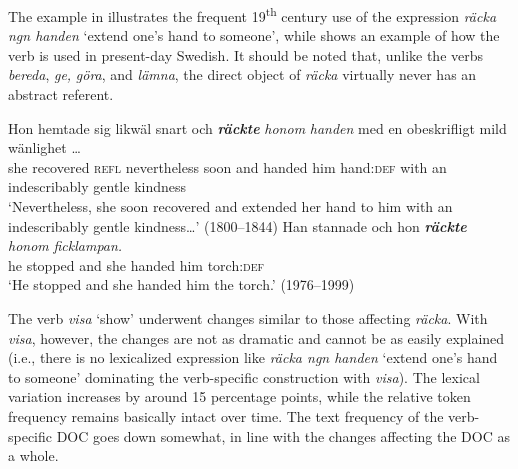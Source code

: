 \documentclass[output=paper]{langscibook}
\begin{document}
The example in  illustrates the frequent 19\textsuperscript{th} century use of the expression \textit{räcka ngn handen} ‘extend one's hand to someone’, while  shows an example of how the verb is used in present-day Swedish. It should be noted that, unlike the verbs \textit{bereda}, \textit{ge,} \textit{göra}, and \textit{lämna}, the direct object of \textit{räcka} virtually never has an abstract referent.


\ea \label{ex:valdeson:16}
\gll Hon hemtade   sig     likwäl        snart  och \textbf{\textit{räckte}} \textit{honom}  \textit{handen} med  en  obeskrifligt    mild    wänlighet …\\
  she  recovered  \textsc{refl}  nevertheless    soon  and  handed him   hand\textsc{:def} with  an  indescribably  gentle  kindness\\
\glt ‘Nevertheless, she soon recovered and extended her hand to him with an indescribably gentle kindness…’ (1800–1844)
\ex \label{ex:valdeson:17}
\gll Han  stannade och  hon \textbf{\textit{räckte}} \textit{honom}      \textit{ficklampan.}\\
  he        stopped  and   she handed him         torch:\textsc{def}\\
\glt `He stopped and she handed him the torch.’ (1976–1999)
\z


\label{sec:valdeson:5.3.2.2}
The verb \textit{visa} ‘show’ underwent changes similar to those affecting \textit{räcka}. With \textit{visa}, however, the changes are not as dramatic and cannot be as easily explained (i.e., there is no lexicalized expression like \textit{räcka ngn handen} ‘extend one's hand to someone’ dominating the verb-specific construction with \textit{visa}). The lexical variation increases by around 15 percentage points, while the relative token frequency remains basically intact over time. The text frequency of the verb-specific DOC goes down somewhat, in line with the changes affecting the DOC as a whole.


\begin{table}
\caption{Frequency measures of the verb-specific DOC with \textit{visa} ‘show’}
\label{tab:valdeson:13}
\end{table}
\end{document}

